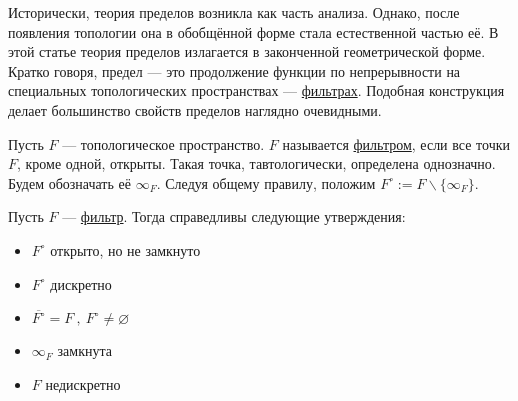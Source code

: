 



    
\SScover
    

Исторически, теория пределов возникла как часть анализа. Однако, после появления топологии она в обобщённой форме стала естественной частью её. 
В этой статье теория пределов излагается в законченной геометрической форме. 
Кратко говоря, предел --- это продолжение функции по непрерывности на специальных топологических пространствах --- \underline{фильтрах}. 
Подобная конструкция делает большинство свойств пределов наглядно очевидными.
    
\SSbullet 

\SSsect Пусть \( F \) --- топологическое пространство. \( F \) называется \underline{фильтром}, если все точки \( F \), кроме одной, открыты. 
Такая точка, тавтологически, определена однозначно. 
Будем обозначать её \( \infty_F \). 
Следуя общему правилу, положим \( F^\circ := F\backslash\{\infty_F\} \).

\SSsect Пусть \( F \) --- \underline{фильтр}. Тогда справедливы следующие утверждения:
\begin{itemize}[label=]
\item \( F^\circ \) открыто, но не замкнуто
\item \( F^\circ \) дискретно
\item \( \overline{F^\circ} = F ~,~ F^\circ\neq\varnothing \)
\item \( \infty_F \) замкнута
\item \( F \) недискретно
\end{itemize}


